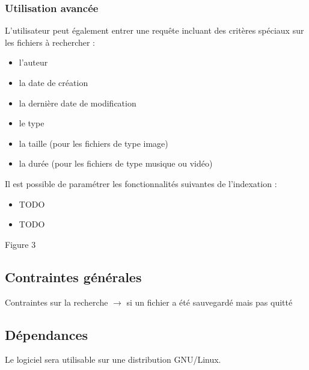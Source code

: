 \documentclass[a4paper,10pt]{report}
\begin{document}
\subsubsection{Utilisation avancée}
L'utilisateur peut également entrer une requête incluant des critères spéciaux
sur les fichiers à rechercher :
\begin{itemize}
 \item l'auteur
 \item la date de création
 \item la dernière date de modification
 \item le type
 \item la taille (pour les fichiers de type image)
 \item la durée (pour les fichiers de type musique ou vidéo)
\end{itemize}
Il est possible de paramétrer les fonctionnalités suivantes de l'indexation :
\begin{itemize}
 \item TODO
 \item TODO
\end{itemize}

Figure 3

\subsection{Contraintes générales}
Contraintes sur la recherche $\rightarrow$ si un fichier a été sauvegardé mais
pas quitté

\subsection{Dépendances}
Le logiciel sera utilisable sur une distribution GNU/Linux.
\end{document}
